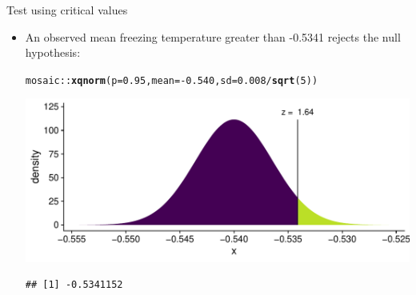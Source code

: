 \documentclass[10pt,handout]{beamer}\usepackage[]{graphicx}\usepackage[]{color}
\makeatletter
\def\maxwidth{ %
  \ifdim\Gin@nat@width>\linewidth
    \linewidth
  \else
    \Gin@nat@width
  \fi
}
\newcommand{\hlnum}[1]{\textcolor[rgb]{0.686,0.059,0.569}{#1}}%
\newcommand{\hlopt}[1]{\textcolor[rgb]{0,0,0}{#1}}%
\newcommand{\hlstd}[1]{\textcolor[rgb]{0.345,0.345,0.345}{#1}}%
\newcommand{\hlkwc}[1]{\textcolor[rgb]{0.333,0.667,0.333}{#1}}%
\newcommand{\hlkwd}[1]{\textcolor[rgb]{0.737,0.353,0.396}{\textbf{#1}}}%
\newenvironment{kframe}{%
 \def\at@end@of@kframe{}%
 \ifinner\ifhmode%
  \def\at@end@of@kframe{\end{minipage}}%
  \begin{minipage}{\columnwidth}%
 \fi\fi%
 \def\FrameCommand##1{\hskip\@totalleftmargin \hskip-\fboxsep
 \colorbox{shadecolor}{##1}\hskip-\fboxsep
     \hskip-\linewidth \hskip-\@totalleftmargin \hskip\columnwidth}%
 \MakeFramed {\advance\hsize-\width
   \@totalleftmargin\z@ \linewidth\hsize
   \@setminipage}}%
 {\par\unskip\endMakeFramed%
 \at@end@of@kframe}
\newenvironment{knitrout}{}{} %
\makeatother
\begin{document}
\begin{frame}[fragile]{Test using critical values}
	\begin{itemize}
		
		\item An observed mean freezing temperature greater than -0.5341 rejects the null hypothesis:
		
\begin{knitrout}\tiny
{}\color{fgcolor}\begin{kframe}
\begin{alltt}
\hlstd{mosaic}\hlopt{::}\hlkwd{xqnorm}\hlstd{(}\hlkwc{p} \hlstd{=} \hlnum{0.95}\hlstd{,} \hlkwc{mean} \hlstd{=} \hlopt{-}\hlnum{0.540}\hlstd{,} \hlkwc{sd} \hlstd{=} \hlnum{0.008}\hlopt{/}\hlkwd{sqrt}\hlstd{(}\hlnum{5}\hlstd{))}
\end{alltt}


{\ttfamily\noindent\itshape\color{messagecolor}{\#\# }}

{\ttfamily\noindent\itshape{}}

{\ttfamily\noindent\itshape\color{messagecolor}{\#\# 	P(X <= -0.5341152) = 0.95}}

{\ttfamily\noindent\itshape\color{messagecolor}{\#\# 	P(X > \ -0.5341152) = 0.05}}

{\ttfamily\noindent\itshape\color{messagecolor}{\#\# }}\end{kframe}

{\centering \includegraphics[width=\maxwidth]{figure/unnamed-chunk-4-1} 

}


\begin{kframe}\begin{verbatim}
## [1] -0.5341152
\end{verbatim}
\end{kframe}
\end{knitrout}
		
		
	\end{itemize}
\end{frame}
\end{document}
